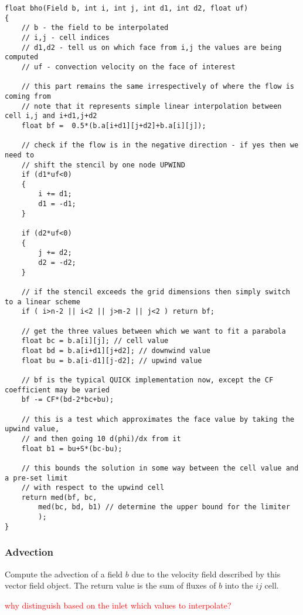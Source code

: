 \documentclass[notitlepage]{article}
\begin{document}
\begin{lstlisting}[style=myCpp]
float bho(Field b, int i, int j, int d1, int d2, float uf)
{
	// b - the field to be interpolated
	// i,j - cell indices
	// d1,d2 - tell us on which face from i,j the values are being computed
	// uf - convection velocity on the face of interest
	
	// this part remains the same irrespectively of where the flow is coming from
	// note that it represents simple linear interpolation between cell i,j and i+d1,j+d2
	float bf =  0.5*(b.a[i+d1][j+d2]+b.a[i][j]);
	
	// check if the flow is in the negative direction - if yes then we need to
	// shift the stencil by one node UPWIND
	if (d1*uf<0)
	{
		i += d1; 
		d1 = -d1;
	}
	
	if (d2*uf<0)
	{
		j += d2;
		d2 = -d2;
	}
	
	// if the stencil exceeds the grid dimensions then simply switch to a linear scheme
	if ( i>n-2 || i<2 || j>m-2 || j<2 ) return bf;
	
	// get the three values between which we want to fit a parabola
	float bc = b.a[i][j]; // cell value
	float bd = b.a[i+d1][j+d2]; // downwind value
	float bu = b.a[i-d1][j-d2]; // upwind value
	
	// bf is the typical QUICK implementation now, except the CF coefficient may be varied
	bf -= CF*(bd-2*bc+bu);
	
	// this is a test which approximates the face value by taking the upwind value,
	// and then going 10 d(phi)/dx from it
	float b1 = bu+S*(bc-bu);
	
	// this bounds the solution in some way between the cell value and a pre-set limit
	// with respect to the upwind cell
	return med(bf, bc,
		med(bc, bd, b1) // determine the upper bound for the limiter
		);
}
\end{lstlisting}

\subsubsection{Advection}

Compute the advection of a field $b$ due to the velocity field described by
this vector field object.
The return value is the sum of fluxes of $b$ into the $ij$ cell.

\textcolor{red}{why distinguish based on the inlet which values to interpolate?}
\end{document}
